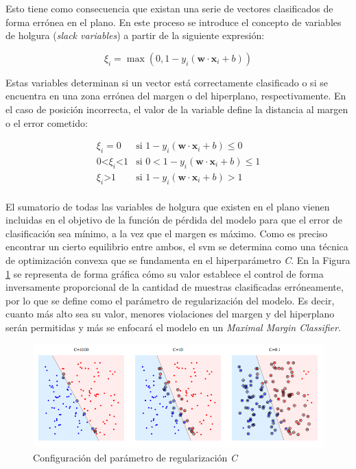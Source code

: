\vspace{3mm}

Esto tiene como consecuencia que existan una serie de vectores clasificados de forma errónea en el plano. En este proceso se introduce el concepto de variables de holgura (\textit{slack variables}) a partir de la siguiente expresión:

\[ \xi_i = \max(0, 1 - y_i (\mathbf{w} \cdot \mathbf{x}_i + b))\]

Estas variables determinan si un vector está correctamente clasificado o si se encuentra en una zona errónea del margen o del hiperplano, respectivamente. En el caso de posición incorrecta, el valor de la variable define la distancia al margen o el error cometido:

\[\begin{array}{ll}
    \xi_i = 0 & \text{si } 1 - y_i (\mathbf{w} \cdot \mathbf{x}_i + b) \leq 0 \\
    0 \text{<} \xi_i \text{<} 1 & \text{si } 0 < 1 - y_i (\mathbf{w} \cdot \mathbf{x}_i + b) \leq 1 \\
    \xi_i \text{>} 1 & \text{si } 1 - y_i (\mathbf{w} \cdot \mathbf{x}_i + b) > 1 \\
\end{array}\]

\vspace{3mm}

El sumatorio de todas las variables de holgura que existen en el plano vienen incluidas en el objetivo de la función de pérdida del modelo para que el error de clasificación sea mínimo, a la vez que el margen es máximo. Como es preciso encontrar un cierto equilibrio entre ambos, el \gls{svm} se determina como una técnica de optimización convexa que se fundamenta en el hiperparámetro \textit{C}. En la Figura \ref{fig:parametroc} se representa de forma gráfica cómo su valor establece el control de forma inversamente proporcional de la cantidad de muestras clasificadas erróneamente, por lo que se define como el parámetro de regularización del modelo. Es decir, cuanto más alto sea su valor, menores violaciones del margen y del hiperplano serán permitidas y más se enfocará el modelo en un \textit{Maximal Margin Classifier}.~\cite{svmciencia}

\vspace{3mm}

\begin{figure}[h!]
    \centering
    \includegraphics[width=1\textwidth]{img/teoria/parametroc.png}
    \caption{Configuración del parámetro de regularización \textit{C} \cite{velocity}}
    \label{fig:parametroc}
\end{figure}

